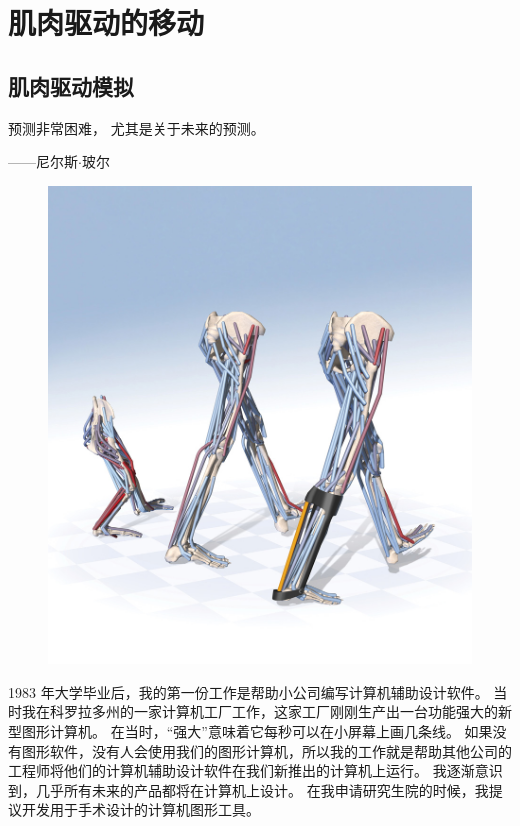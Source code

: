 \part{肌肉驱动的移动}



\chapter{肌肉驱动模拟} \label{chap:chap10}


预测非常困难，
尤其是关于未来的预测。
\begin{flushright}
	——尼尔斯$ \cdot $玻尔
\end{flushright}


\begin{figure}[!htb]
	\centering
	\includegraphics[width=0.9\linewidth]{chap10/10_0}
	\caption*{ \label{fig:10_0}}
\end{figure}

1983 年大学毕业后，我的第一份工作是帮助小公司编写计算机辅助设计软件。
当时我在科罗拉多州的一家计算机工厂工作，这家工厂刚刚生产出一台功能强大的新型图形计算机。
在当时，“强大”意味着它每秒可以在小屏幕上画几条线。
如果没有图形软件，没有人会使用我们的图形计算机，所以我的工作就是帮助其他公司的工程师将他们的计算机辅助设计软件在我们新推出的计算机上运行。
我逐渐意识到，几乎所有未来的产品都将在计算机上设计。
在我申请研究生院的时候，我提议开发用于手术设计的计算机图形工具。


